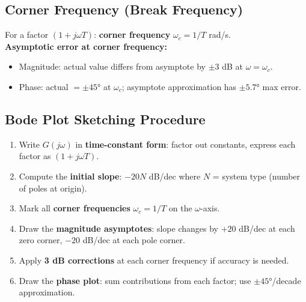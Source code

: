 \documentclass[12pt,a4paper]{article}
\begin{document}
\subsection{Corner Frequency (Break Frequency)}

\begin{tcolorbox}[formulabox, title={Corner Frequency}]
For a factor $(1+j\omega T)$: \textbf{corner frequency} $\omega_c = 1/T$ rad/s.\\[4pt]
\textbf{Asymptotic error at corner frequency:}
\begin{itemize}[leftmargin=*, itemsep=2pt, topsep=2pt]
  \item Magnitude: actual value differs from asymptote by $\pm 3$ dB at $\omega = \omega_c$.
  \item Phase: actual $= \pm 45°$ at $\omega_c$; asymptote approximation has $\pm 5.7°$ max error.
\end{itemize}
\end{tcolorbox}

\subsection{Bode Plot Sketching Procedure}

\begin{enumerate}[label=\textbf{Step \arabic*:}, leftmargin=2.5cm, itemsep=3pt]
  \item Write $G(j\omega)$ in \textbf{time-constant form}: factor out constants, express each factor as $(1+j\omega T)$.
  \item Compute the \textbf{initial slope}: $-20N$ dB/dec where $N$ = system type (number of poles at origin).
  \item Mark all \textbf{corner frequencies} $\omega_c = 1/T$ on the $\omega$-axis.
  \item Draw the \textbf{magnitude asymptotes}: slope changes by $+20$ dB/dec at each zero corner, $-20$ dB/dec at each pole corner.
  \item Apply \textbf{3 dB corrections} at each corner frequency if accuracy is needed.
  \item Draw the \textbf{phase plot}: sum contributions from each factor; use $\pm45°$/decade approximation.
\end{enumerate}
\end{document}
